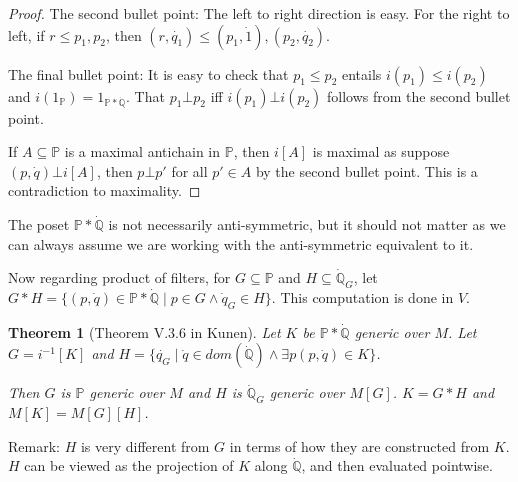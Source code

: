 \documentclass{article}
\newtheorem{theorem}{Theorem}
\newcommand{\bbP}{\mathbb{P}}
\newcommand{\bbQ}{\mathbb{Q}}
\begin{document}
\begin{proof}

    The second bullet point: The left to right direction is easy. For the right to left, if $r\leq p_1,p_2$, then $(r,\dot{q_1})\leq (p_1,\dot{1}), (p_2,\dot{q_2})$.

    The final bullet point: It is easy to check that $p_1\leq p_2$ entails $i(p_1)\leq i(p_2)$ and $ i(1_\mathbb{P}) = 1_{\mathbb{P}*\dot{\mathbb{Q}}}$. That $p_1\bot p_2$ iff $i(p_1)\bot i(p_2)$ follows from the second bullet point.

    If $A\subseteq \mathbb{P}$ is a maximal antichain in $\mathbb{P}$, then $i[A]$ is maximal as suppose $(p,\dot{q})\bot i[A]$, then $p\bot p'$ for all $p'\in A$ by the second bullet point. This is a contradiction to maximality.
\end{proof}

The poset $\mathbb{P}*\dot{\mathbb{Q}}$ is not necessarily anti-symmetric, but it should not matter as we can always assume we are working with the anti-symmetric equivalent to it.

Now regarding product of filters, 
for $G\subseteq \bbP$ and $H\subseteq \dot{\bbQ}_G$, let $G * H = \{(p,\dot{q})\in \bbP * \dot{\bbQ}\mid p\in G\land \dot{q}_G\in H\}$. This computation is done in $V$.

\begin{theorem}[Theorem V.3.6 in Kunen]\label{thm:two-step-iteration}
    Let $K$ be $\mathbb{P}*\dot{\mathbb{Q}}$ generic over $M$. Let $G = i^{-1}[K]$ and $H = \{\dot{q_G}\mid \dot{q}\in dom(\dot{\bbQ})\land \exists p(p,\dot{q})\in K\}$. 

    Then $G$ is $\bbP$ generic over $M$ and $H$ is $\dot{\bbQ}_G$ generic over $M[G]$. $K = G * H$ and $M[K] = M[G][H]$.
\end{theorem}

Remark: $H$ is very different from $G$ in terms of how they are constructed from $K$. $H$ can be viewed as the projection of $K$ along $\dot{\bbQ}$, and then evaluated pointwise.
\end{document}
